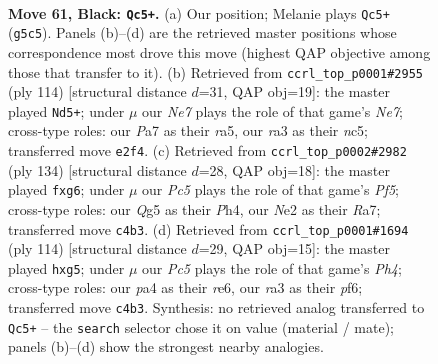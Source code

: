 \documentclass[11pt]{article}
\begin{document}
\clearpage

\begin{figure}[p]\centering
\begin{subfigure}{0.46\textwidth}\centering
\resizebox{\linewidth}{!}{%
\newchessgame
\chessboard[
  setfen={8/p5k1/1p6/6q1/P1p5/RP6/4nK2/8 b - - 5 61},
  showmover=false,
  pgfstyle=straightmove, color=movearrow, markmove={g5-c5}
]}
\caption{}
\end{subfigure}\hfill
\begin{subfigure}{0.46\textwidth}\centering
\resizebox{\linewidth}{!}{%
\newchessgame
\chessboard[
  setfen={1R6/4N3/5kp1/r1n4p/3K3P/6P1/8/8 w - - 0 58},
  showmover=false,
  pgfstyle=straightmove, color=movearrow, markmove={e7-d5}
]}
\caption{}
\end{subfigure}
\\[4pt]
\begin{subfigure}{0.46\textwidth}\centering
\resizebox{\linewidth}{!}{%
\newchessgame
\chessboard[
  setfen={6k1/R7/6p1/1p3P1p/7P/P5r1/8/4K3 w - - 3 68},
  showmover=false,
  pgfstyle=straightmove, color=movearrow, markmove={f5-g6}
]}
\caption{}
\end{subfigure}\hfill
\begin{subfigure}{0.46\textwidth}\centering
\resizebox{\linewidth}{!}{%
\newchessgame
\chessboard[
  setfen={8/5b1k/4rp2/6p1/3Q3P/8/5K2/8 w - - 0 58},
  showmover=false,
  pgfstyle=straightmove, color=movearrow, markmove={h4-g5}
]}
\caption{}
\end{subfigure}
\caption{\textbf{Move 61, Black: \texttt{Qc5+}.} (a) Our position; Melanie plays \texttt{Qc5+} (\texttt{g5c5}). Panels (b)--(d) are the retrieved master positions whose correspondence most drove this move (highest QAP objective among those that transfer to it). (b) Retrieved from \texttt{ccrl\_top\_p0001\#2955} (ply 114) [structural distance $d$=31, QAP obj=19]: the master played \texttt{Nd5+}; under $\mu$ our \emph{Ne7} plays the role of that game's \emph{Ne7}; cross-type roles: our \emph{P}a7 as their \emph{r}a5, our \emph{r}a3 as their \emph{n}c5; transferred move \texttt{e2f4}. (c) Retrieved from \texttt{ccrl\_top\_p0002\#2982} (ply 134) [structural distance $d$=28, QAP obj=18]: the master played \texttt{fxg6}; under $\mu$ our \emph{Pc5} plays the role of that game's \emph{Pf5}; cross-type roles: our \emph{Q}g5 as their \emph{P}h4, our \emph{N}e2 as their \emph{R}a7; transferred move \texttt{c4b3}. (d) Retrieved from \texttt{ccrl\_top\_p0001\#1694} (ply 114) [structural distance $d$=29, QAP obj=15]: the master played \texttt{hxg5}; under $\mu$ our \emph{Pc5} plays the role of that game's \emph{Ph4}; cross-type roles: our \emph{p}a4 as their \emph{r}e6, our \emph{r}a3 as their \emph{p}f6; transferred move \texttt{c4b3}. Synthesis: no retrieved analog transferred to \texttt{Qc5+} -- the \texttt{search} selector chose it on value (material / mate); panels (b)--(d) show the strongest nearby analogies.}
\label{fig:thought-m121}
\end{figure}
\end{document}
